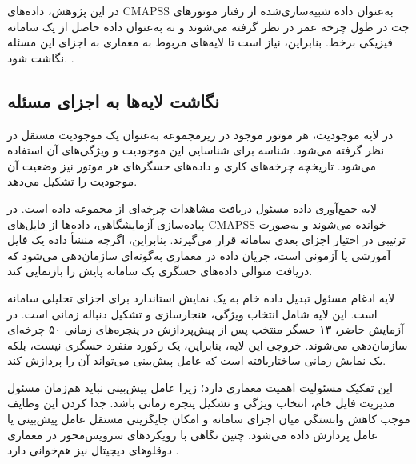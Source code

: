 در این پژوهش، داده‌های \gls{CMAPSS} به‌عنوان داده شبیه‌سازی‌شده
از رفتار موتورهای جت در طول چرخه عمر در نظر گرفته می‌شوند و نه
به‌عنوان داده حاصل از یک سامانه فیزیکی برخط. بنابراین، نیاز است تا لایه‌های مربوط به معماری به اجزای این مسئله نگاشت شود. \cite{qi2021enabling,tao2018digital}.

\subsection{نگاشت لایه‌ها به اجزای مسئله}
\label{sec:layer-mapping}

در لایه موجودیت، هر موتور موجود در زیرمجموعه  به‌عنوان
یک موجودیت مستقل در نظر گرفته می‌شود. شناسه 
برای شناسایی این موجودیت و ویژگی‌های آن استفاده
می‌شود. تاریخچه چرخه‌های کاری و داده‌های حسگرهای هر موتور نیز وضعیت آن موجودیت را تشکیل می‌دهد.

لایه جمع‌آوری داده مسئول دریافت مشاهدات چرخه‌ای از مجموعه داده
است. در پیاده‌سازی آزمایشگاهی، داده‌ها از فایل‌های
\gls{CMAPSS} خوانده می‌شوند و به‌صورت ترتیبی در اختیار اجزای
بعدی سامانه قرار می‌گیرند. بنابراین، اگرچه منشأ داده یک فایل
آموزشی یا آزمونی است، جریان داده در معماری به‌گونه‌ای سازمان‌دهی
می‌شود که دریافت متوالی داده‌های حسگری یک سامانه پایش را بازنمایی
کند.

لایه ادغام مسئول تبدیل داده خام به یک نمایش استاندارد برای اجزای
تحلیلی سامانه است. این لایه شامل انتخاب ویژگی، هنجارسازی و تشکیل
دنباله زمانی است. در آزمایش حاضر، ۱۳ حسگر منتخب پس از
پیش‌پردازش در پنجره‌های زمانی ۵۰ چرخه‌ای سازمان‌دهی می‌شوند.
خروجی این لایه، بنابراین، یک رکورد منفرد حسگری نیست، بلکه یک
نمایش زمانی ساختاریافته است که عامل پیش‌بینی می‌تواند آن را
پردازش کند.

این تفکیک مسئولیت اهمیت معماری دارد؛ زیرا عامل پیش‌بینی نباید
هم‌زمان مسئول مدیریت فایل خام، انتخاب ویژگی و تشکیل پنجره زمانی
باشد. جدا کردن این وظایف موجب کاهش وابستگی میان اجزای سامانه و
امکان جایگزینی مستقل عامل پیش‌بینی یا عامل پردازش داده می‌شود. چنین
نگاهی با رویکردهای سرویس‌محور در معماری دوقلوهای دیجیتال نیز
هم‌خوانی دارد \cite{qi2021enabling,tao2018digital}.

